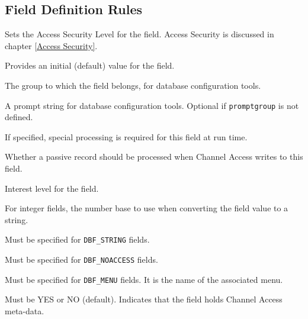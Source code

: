 \subsection{Field Definition Rules}

\begin{description}

\item [asl] Sets the Access Security Level for the field.
Access Security is discussed in chapter \ref{Access Security}.

\item [initial] Provides an initial (default) value for the field.

\item [promptgroup] The group to which the field belongs, for database configuration tools.

\item [prompt] A prompt string for database configuration tools.
Optional if \verb|promptgroup| is not defined.

\item [special] If specified, special processing is required for this field at run time.

\item [pp] Whether a passive record should be processed when Channel Access writes to this field.

\item [interest] Interest level for the field.

\item [base] For integer fields, the number base to use when converting the field value to a string.

\item [size] Must be specified for \verb|DBF_STRING| fields.

\item [extra] Must be specified for \verb|DBF_NOACCESS| fields.

\item [menu] Must be specified for \verb|DBF_MENU| fields. It is the name of the associated menu.

\item [prop] Must be YES or NO (default).  Indicates that the field holds Channel Access meta-data.
\end{description}

